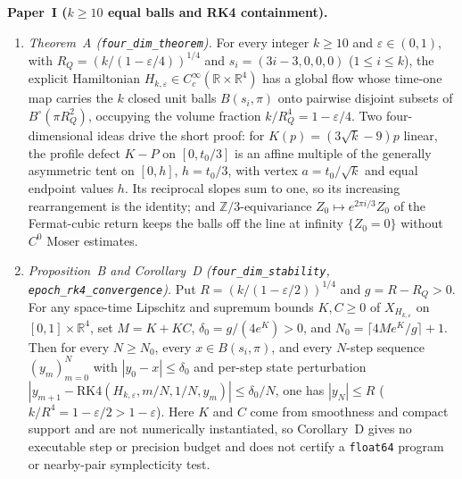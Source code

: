 \documentclass[11pt]{amsart}
\newcommand{\R}{\mathbb{R}}
\newcommand{\Z}{\mathbb{Z}}
\newcommand{\eps}{\varepsilon}
\newcommand{\Bo}{B^{\circ}}
\begin{document}
\smallskip\noindent\textbf{Paper~I ($k\ge10$ equal balls and RK4 containment).}
\begin{enumerate}[label=(\roman*),leftmargin=2em]
\item \emph{Theorem~A (\texttt{four\_dim\_theorem}).} For every integer $k\ge10$ and $\eps\in(0,1)$, with
$R_Q=(k/(1-\eps/4))^{1/4}$ and $s_i=(3i-3,0,0,0)$ ($1\le i\le k$), the explicit Hamiltonian $H_{k,\eps}\in
C^\infty_c(\R\times\R^4)$ has a global flow whose time-one map carries the $k$ closed unit balls $B(s_i,\pi)$ onto
pairwise disjoint subsets of $\Bo(\pi R_Q^2)$, occupying the volume fraction $k/R_Q^4=1-\eps/4$. Two four-dimensional
ideas drive the short proof: for $K(p)=(3\sqrt k-9)p$ linear, the profile defect $K-P$ on $[0,t_0/3]$ is an affine
multiple of the generally asymmetric tent on $[0,h]$, $h=t_0/3$, with vertex $a=t_0/\sqrt k$ and equal endpoint
values $h$. Its reciprocal slopes sum to one, so its increasing rearrangement is the identity; and $\Z/3$-equivariance
$Z_0\mapsto e^{2\pi i/3}Z_0$ of the Fermat-cubic return keeps the balls off the line at infinity $\{Z_0=0\}$ without
$C^0$ Moser estimates.
\item \emph{Proposition~B and Corollary~D (\texttt{four\_dim\_stability}, \texttt{epoch\_rk4\_convergence}).} Put
$R=(k/(1-\eps/2))^{1/4}$ and $g=R-R_Q>0$. For any space-time Lipschitz and supremum bounds $K,C\ge0$ of $X_{H_{k,\eps}}$
on $[0,1]\times\R^4$, set $M=K+KC$, $\delta_0=g/(4e^K)>0$, and $N_0=\lceil 4Me^K/g\rceil+1$. Then for every $N\ge N_0$,
every $x\in B(s_i,\pi)$, and every $N$-step sequence $(y_m)_{m=0}^N$ with $|y_0-x|\le\delta_0$ and per-step state
perturbation $|y_{m+1}-\mathrm{RK4}(H_{k,\eps},m/N,1/N,y_m)|\le\delta_0/N$, one has $|y_N|\le R$ ($k/R^4=1-\eps/2>1-\eps$).
Here $K$ and $C$ come from smoothness and compact support and are not numerically instantiated, so Corollary~D gives no
executable step or precision budget and does not certify a \texttt{float64} program or nearby-pair symplecticity test.
\end{enumerate}
\end{document}
